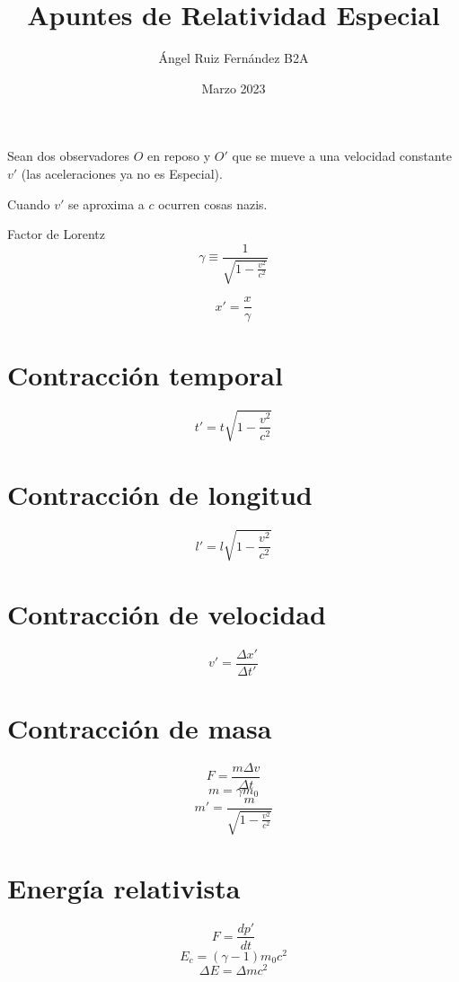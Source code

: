 \documentclass[12pt, letterpaper, twoside]{article}
\title{Apuntes de Relatividad Especial}
\author{Ángel Ruiz Fernández B2A}
\date{Marzo 2023}
\begin{document}
	\maketitle
	
	Sean dos observadores $O$ en reposo y $O'$ que se mueve a una velocidad constante $v'$ (las aceleraciones ya no es Especial).
	
	Cuando $v'$ se aproxima a $c$ ocurren cosas nazis.
	
	Factor de Lorentz
	\begin{equation}
		\gamma \equiv \frac{1}{\sqrt{1 - \frac{v^2}{c^2}}}
	\end{equation}

	\begin{equation}
		x' = \frac{x}{\gamma}
	\end{equation}
	
	\section{Contracción temporal}
	\begin{equation}
		t ' = t \sqrt{1 - \frac{v^2}{c^2}}
	\end{equation}

	\section{Contracción de longitud}
	\begin{equation}
		l ' = l \sqrt{1 - \frac{v^2}{c^2}}
	\end{equation}

	\section{Contracción de velocidad}
	\begin{equation}
		v ' = \frac{\Delta x'}{\Delta t'}
	\end{equation}

	\section{Contracción de masa}
	\begin{equation}
		F = \frac{m\Delta v}{\Delta t}
	\end{equation}
	\begin{equation}
		m = \gamma m_0
	\end{equation}
	\begin{equation}
		m' = \frac{m}{\sqrt{1 - \frac{v^2}{c^2}}}
	\end{equation}

	\section{Energía relativista}
	\begin{equation}
		F = \frac{dp'}{dt}
	\end{equation}
	\begin{equation}
		E_c = (\gamma - 1) m_0 c^2
	\end{equation}
	\begin{equation}
		\Delta E = \Delta m c^2
	\end{equation}
	
	
\end{document}
